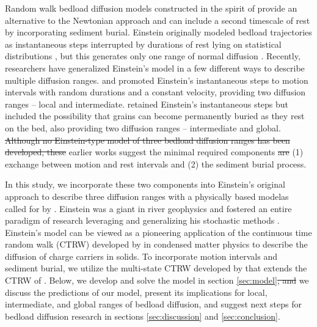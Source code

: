 \documentclass[grl]{agujournal2018}
\providecommand{\DIFadd}[1]{{\protect\color{blue}\uwave{#1}}} %
\providecommand{\DIFdel}[1]{{\protect\color{red}\sout{#1}}}                      %
\providecommand{\DIFaddbegin}{} %
\providecommand{\DIFaddend}{} %
\providecommand{\DIFdelbegin}{} %
\providecommand{\DIFdelend}{} %
\begin{document}
Random walk bedload diffusion models constructed in the spirit of \citet{Einstein1937} provide an alternative to the Newtonian approach and can include a second timescale of rest by incorporating sediment burial.
Einstein originally modeled bedload trajectories as instantaneous steps interrupted by durations of rest lying on statistical distributions \citep{Hassan1991}, but this generates only one range of normal diffusion \citep{Einstein1937,Hubbell1964,Nakagawa1976}.
Recently, researchers have generalized Einstein's model in a few different ways to describe multiple diffusion ranges.
\citet{Lisle1998} and \citet{Lajeunesse2018} promoted Einstein's instantaneous steps to motion intervals with random durations and a constant velocity, providing two diffusion ranges -- local and intermediate.
\citet{Wu2019} retained Einstein's instantaneous steps but included the possibility that grains can become permanently buried as they rest on the bed, also providing two diffusion ranges -- intermediate and global. 
\DIFdelbegin \DIFdel{Although no Einstein-type model of three bedload diffusion ranges has been developed, these }\DIFdelend \DIFaddbegin \DIFadd{These }\DIFaddend earlier works suggest the minimal required components \DIFdelbegin \DIFdel{are }\DIFdelend \DIFaddbegin \DIFadd{to model three bedload diffusion ranges: }\DIFaddend (1) exchange between motion and rest intervals and (2) the sediment burial process.

In this study, we incorporate these two components into Einstein's original approach to describe three diffusion ranges with a physically based model\DIFaddbegin \DIFadd{, }\DIFaddend as called for by \citet{Nikora2002}.
Einstein was a giant in river geophysics and fostered an entire paradigm of research leveraging and generalizing his stochastic methods \citep{Hubbell1964, Yano1969, Yang1971, Gordon1972, Nakagawa1976,Paintal1971}.
Einstein's model can be viewed as a pioneering application of the continuous time random walk (CTRW) developed by \citet{Montroll1965} in condensed matter physics to describe the diffusion of charge carriers in solids.
To incorporate motion intervals and sediment burial, we utilize the multi-state CTRW developed by \citet{Weiss1976, Weiss1994} that extends the CTRW of \citet{Montroll1965}.
Below, we develop and solve the model in section \ref{sec:model}\DIFdelbegin \DIFdel{, and }\DIFdelend \DIFaddbegin \DIFadd{. Then, }\DIFaddend we discuss the predictions of our model, present its implications for local, intermediate, and global ranges of bedload diffusion, and suggest next steps for bedload diffusion research in sections \ref{sec:discussion} and \ref{sec:conclusion}.
\end{document}
